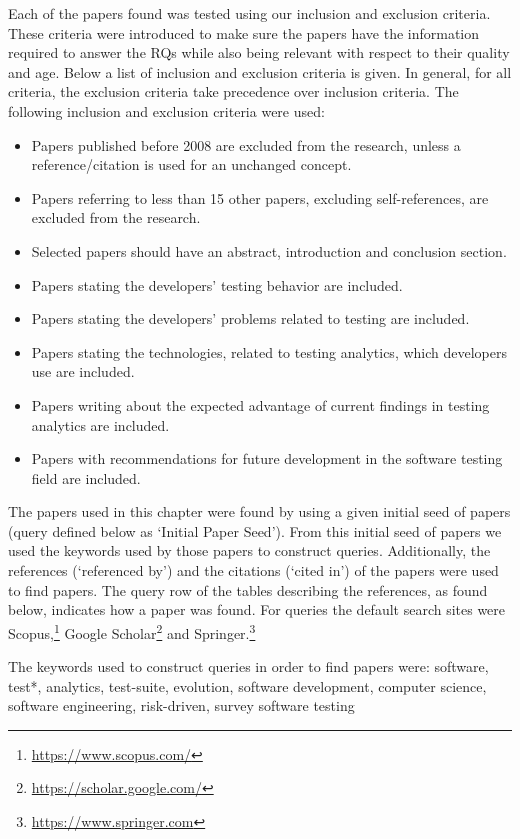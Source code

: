 \documentclass[]{book}
\providecommand{\tightlist}{%
  \setlength{\itemsep}{0pt}\setlength{\parskip}{0pt}}
\let\rmarkdownfootnote\footnote%
\def\footnote{\protect\rmarkdownfootnote}
\begin{document}
Each of the papers found was tested using our inclusion and exclusion
criteria. These criteria were introduced to make sure the papers have
the information required to answer the RQs while also being relevant
with respect to their quality and age. Below a list of inclusion and
exclusion criteria is given. In general, for all criteria, the exclusion
criteria take precedence over inclusion criteria. The following
inclusion and exclusion criteria were used:

\begin{itemize}
\tightlist
\item
  Papers published before 2008 are excluded from the research, unless a
  reference/citation is used for an unchanged concept.
\item
  Papers referring to less than 15 other papers, excluding
  self-references, are excluded from the research.
\item
  Selected papers should have an abstract, introduction and conclusion
  section.
\item
  Papers stating the developers' testing behavior are included.
\item
  Papers stating the developers' problems related to testing are
  included.
\item
  Papers stating the technologies, related to testing analytics, which
  developers use are included.
\item
  Papers writing about the expected advantage of current findings in
  testing analytics are included.
\item
  Papers with recommendations for future development in the software
  testing field are included.
\end{itemize}

The papers used in this chapter were found by using a given initial seed
of papers (query defined below as `Initial Paper Seed'). From this
initial seed of papers we used the keywords used by those papers to
construct queries. Additionally, the references (`referenced by') and
the citations (`cited in') of the papers were used to find papers. The
query row of the tables describing the references, as found below,
indicates how a paper was found. For queries the default search sites
were Scopus,\footnote{\url{https://www.scopus.com/}} Google
Scholar\footnote{\url{https://scholar.google.com/}} and
Springer.\footnote{\url{https://www.springer.com}}

The keywords used to construct queries in order to find papers were:
software, test*, analytics, test-suite, evolution, software development,
computer science, software engineering, risk-driven, survey software
testing
\end{document}
